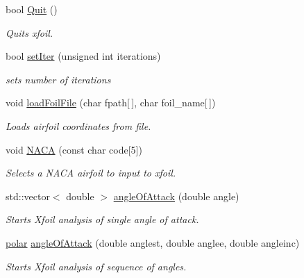 \begin{DoxyCompactItemize}
\mbox{\label{classXfoilInterface_a7225d1f5817cb79f9f938c8dc616a360}} 
bool \hyperlink{classXfoilInterface_a7225d1f5817cb79f9f938c8dc616a360}{Quit} ()
\begin{DoxyCompactList}\small\item\em Quits xfoil. \end{DoxyCompactList}\item 
\mbox{\label{classXfoilInterface_a21659717b7901562e97d25460e8c4f42}} 
bool \hyperlink{classXfoilInterface_a21659717b7901562e97d25460e8c4f42}{set\+Iter} (unsigned int iterations)
\begin{DoxyCompactList}\small\item\em sets number of iterations \end{DoxyCompactList}\item 
void \hyperlink{classXfoilInterface_ae6be41dc3be9e28cd36ed5e9a40b0854}{load\+Foil\+File} (char fpath\mbox{[}$\,$\mbox{]}, char foil_name\mbox{[}$\,$\mbox{]})
\begin{DoxyCompactList}\small\item\em Loads airfoil coordinates from file. \end{DoxyCompactList}\item 
void \hyperlink{classXfoilInterface_a202072a14053054a55501c45a296bce7}{N\+A\+CA} (const char code\mbox{[}5\mbox{]})
\begin{DoxyCompactList}\small\item\em Selects a N\+A\+CA airfoil to input to xfoil. \end{DoxyCompactList}\item 
std\+::vector$<$ double $>$ \hyperlink{classXfoilInterface_a7937559afde3fe6880b64b4d8b278256}{angle\+Of\+Attack} (double angle)
\begin{DoxyCompactList}\small\item\em Starts Xfoil analysis of single angle of attack. \end{DoxyCompactList}\item 
\hyperlink{classpolar}{polar} \hyperlink{classXfoilInterface_ac2b547ba157afbb666ddf5f3eff271e2}{angle\+Of\+Attack} (double anglest, double anglee, double angleinc)
\begin{DoxyCompactList}\small\item\em Starts Xfoil analysis of sequence of angles. \end{DoxyCompactList}\item 

\end{DoxyCompactItemize}
